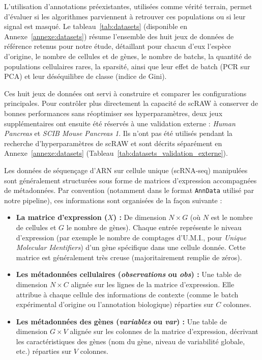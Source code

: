 L'utilisation d'annotations préexistantes, utilisées comme vérité terrain, permet d'évaluer si les algorithmes parviennent à retrouver ces populations ou si leur signal est masqué. Le tableau~\ref{tab:datasets} (disponible en Annexe~\ref{annexe:datasets}) résume l'ensemble des huit jeux de données de référence retenus pour notre étude, détaillant pour chacun d'eux l'espèce d'origine, le nombre de cellules et de gènes, le nombre de batchs, la quantité de populations cellulaires rares, la sparsité, ainsi que leur effet de batch (PCR sur PCA) et leur déséquilibre de classe (indice de Gini).

Ces huit jeux de données ont servi à construire et comparer les configurations principales. Pour contrôler plus directement la capacité de scRAW à conserver de bonnes performances sans réoptimiser ses hyperparamètres, deux jeux supplémentaires ont ensuite été réservés à une validation externe : \textit{Human Pancreas} et \textit{SCIB Mouse Pancreas 1}. Ils n'ont pas été utilisés pendant la recherche d'hyperparamètres de scRAW et sont décrits séparément en Annexe~\ref{annexe:datasets} (Tableau~\ref{tab:datasets_validation_externe}).

Les données de séquençage d'ARN sur cellule unique (scRNA-seq) manipulées sont généralement structurées sous forme de matrices d'expression accompagnées de métadonnées. Par convention (notamment dans le format \texttt{AnnData} utilisé par notre pipeline), ces informations sont organisées de la façon suivante :
\begin{itemize}
    \item \textbf{La matrice d'expression ($X$) :} De dimension $N \times G$ (où $N$ est le nombre de cellules et $G$ le nombre de gènes). Chaque entrée représente le niveau d'expression (par exemple le nombre de comptages d'U.M.I., pour \textit{Unique Molecular Identifiers}) d'un gène spécifique dans une cellule donnée. Cette matrice est généralement très creuse (majoritairement remplie de zéros).
    \item \textbf{Les métadonnées cellulaires (\textit{observations} ou \textit{obs}) :} Une table de dimension $N \times C$ alignée sur les lignes de la matrice d'expression. Elle attribue à chaque cellule des informations de contexte (comme le batch expérimental d'origine ou l'annotation biologique) réparties sur $C$ colonnes.
    \item \textbf{Les métadonnées des gènes (\textit{variables} ou \textit{var}) :} Une table de dimension $G \times V$ alignée sur les colonnes de la matrice d'expression, décrivant les caractéristiques des gènes (nom du gène, niveau de variabilité globale, etc.) réparties sur $V$ colonnes.
\end{itemize}

